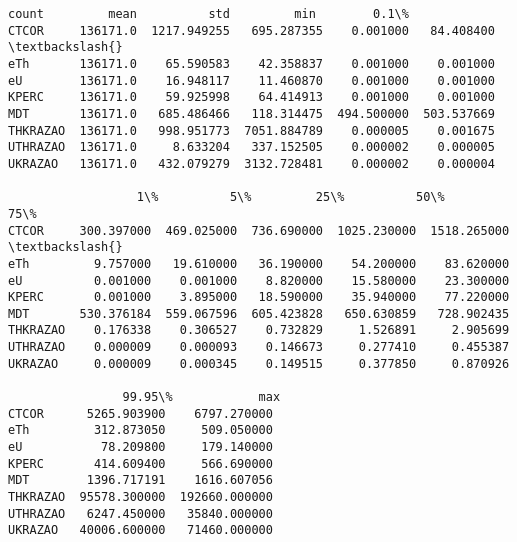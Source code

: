\documentclass[11pt]{article}
\begin{document}
    \begin{Verbatim}[commandchars=\\\{\}]
             count         mean          std         min        0.1\%
CTCOR     136171.0  1217.949255   695.287355    0.001000   84.408400  \textbackslash{}
eTh       136171.0    65.590583    42.358837    0.001000    0.001000
eU        136171.0    16.948117    11.460870    0.001000    0.001000
KPERC     136171.0    59.925998    64.414913    0.001000    0.001000
MDT       136171.0   685.486466   118.314475  494.500000  503.537669
THKRAZAO  136171.0   998.951773  7051.884789    0.000005    0.001675
UTHRAZAO  136171.0     8.633204   337.152505    0.000002    0.000005
UKRAZAO   136171.0   432.079279  3132.728481    0.000002    0.000004

                  1\%          5\%         25\%          50\%          75\%
CTCOR     300.397000  469.025000  736.690000  1025.230000  1518.265000  \textbackslash{}
eTh         9.757000   19.610000   36.190000    54.200000    83.620000
eU          0.001000    0.001000    8.820000    15.580000    23.300000
KPERC       0.001000    3.895000   18.590000    35.940000    77.220000
MDT       530.376184  559.067596  605.423828   650.630859   728.902435
THKRAZAO    0.176338    0.306527    0.732829     1.526891     2.905699
UTHRAZAO    0.000009    0.000093    0.146673     0.277410     0.455387
UKRAZAO     0.000009    0.000345    0.149515     0.377850     0.870926

                99.95\%            max
CTCOR      5265.903900    6797.270000
eTh         312.873050     509.050000
eU           78.209800     179.140000
KPERC       414.609400     566.690000
MDT        1396.717191    1616.607056
THKRAZAO  95578.300000  192660.000000
UTHRAZAO   6247.450000   35840.000000
UKRAZAO   40006.600000   71460.000000
    \end{Verbatim}

    \begin{center}
    \end{center}
    { \hspace*{\fill} \\}
    
    \begin{center}
    \end{center}
    { \hspace*{\fill} \\}
    
\end{document}
